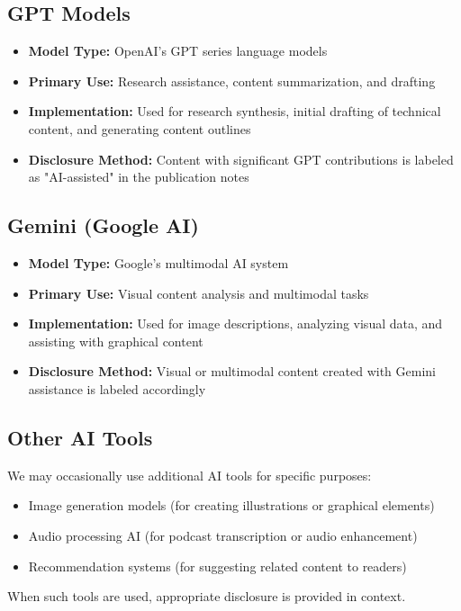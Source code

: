 \documentclass[11pt]{article}
\begin{document}
\subsection{GPT Models}
\begin{itemize}
  \item \textbf{Model Type:} OpenAI's GPT series language models
  \item \textbf{Primary Use:} Research assistance, content summarization, and drafting
  \item \textbf{Implementation:} Used for research synthesis, initial drafting of technical content, and generating content outlines
  \item \textbf{Disclosure Method:} Content with significant GPT contributions is labeled as "AI-assisted" in the publication notes
\end{itemize}

\subsection{Gemini (Google AI)}
\begin{itemize}
  \item \textbf{Model Type:} Google's multimodal AI system
  \item \textbf{Primary Use:} Visual content analysis and multimodal tasks
  \item \textbf{Implementation:} Used for image descriptions, analyzing visual data, and assisting with graphical content
  \item \textbf{Disclosure Method:} Visual or multimodal content created with Gemini assistance is labeled accordingly
\end{itemize}

\subsection{Other AI Tools}
We may occasionally use additional AI tools for specific purposes:
\begin{itemize}
  \item Image generation models (for creating illustrations or graphical elements)
  \item Audio processing AI (for podcast transcription or audio enhancement)
  \item Recommendation systems (for suggesting related content to readers)
\end{itemize}
When such tools are used, appropriate disclosure is provided in context.
\end{document}
